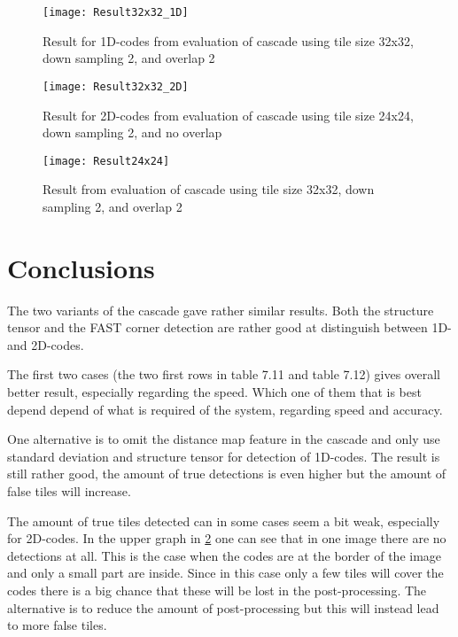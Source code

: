 \begin{figure}[H]
\centering
	\texttt{[image: Result32x32\_1D]}
	\caption{Result for 1D-codes from evaluation of cascade using tile size 32x32, down sampling 2, and overlap 2}
	\label{Result32x32_1D}
\end{figure}

\begin{figure}[H]
\centering
	\texttt{[image: Result32x32\_2D]}
	\caption{Result for 2D-codes from evaluation of cascade using tile size 24x24, down sampling 2, and no overlap}
	\label{Result24x24_2D}
\end{figure}

\begin{figure}[H]
\centering
	\texttt{[image: Result24x24]}
	\caption{Result from evaluation of cascade using tile size 32x32, down sampling 2, and overlap 2}
	\label{Result32x32}
\end{figure}

\section{Conclusions}
\label{sec:Conclusions}
The two variants of the cascade gave rather similar results. Both the structure tensor and the FAST corner detection are rather good at distinguish between 1D- and 2D-codes.

The first two cases (the two first rows in table 7.11 and table 7.12) gives overall better result, especially regarding the speed. Which one of them that is best depend depend of what is required of the system, regarding speed and accuracy.

One alternative is to omit the distance map feature in the cascade and only use standard deviation and structure tensor for detection of 1D-codes. The result is still rather good, the amount of true detections is even higher but the amount of false tiles will increase.

The amount of true tiles detected can in some cases seem a bit weak, especially for 2D-codes. In the upper graph in \ref{Result24x24_2D} one can see that in one image there are no detections at all. This is the case when the codes are at the border of the image and only a small part are inside. Since in this case only a few tiles will cover the codes there is a big chance that these will be lost in the post-processing. The alternative is to reduce the amount of post-processing but this will instead lead to more false tiles.  

